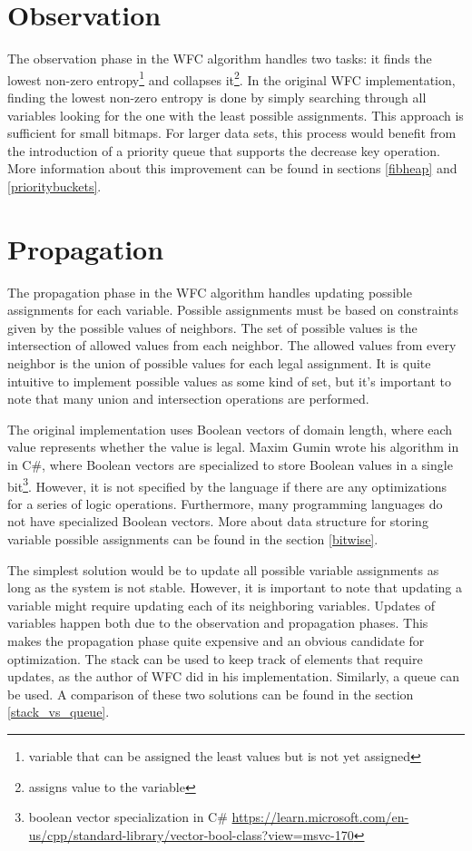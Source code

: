 \documentclass[shortabstract, english, inz]{iithesis}
\begin{document}
\section{Observation}
The observation phase in the WFC algorithm handles two tasks: it finds the lowest non-zero entropy\footnote{variable that can be assigned the least values but is not yet assigned} and collapses it\footnote{assigns value to the variable}.
In the original WFC implementation, finding the lowest non-zero entropy is done by simply searching through all variables looking for the one with the least possible assignments. \cite{MaximGumin} This approach is sufficient for small bitmaps. For larger data sets, this process would benefit from the introduction of a priority queue that supports the decrease key operation.
 More information about this improvement can be found in sections \ref{fibheap} and \ref{prioritybuckets}.

\section{Propagation}%
The propagation phase in the WFC algorithm handles updating possible assignments for each variable. Possible assignments must be based on constraints given by the possible values of neighbors. The set of possible values is the intersection of allowed values from each neighbor. The allowed values from every neighbor is the union of possible values for each legal assignment. It is quite intuitive to implement possible values as some kind of set, but it's important to note that many union and intersection operations are performed.

The original implementation uses Boolean vectors of domain length, where each value represents whether the value is legal. Maxim Gumin wrote his algorithm in in C\#, where Boolean vectors are specialized to store Boolean values in a single bit\footnote{boolean vector specialization in C\# \url{https://learn.microsoft.com/en-us/cpp/standard-library/vector-bool-class?view=msvc-170}}. However, it is not specified by the language if there are any optimizations for a series of logic operations. Furthermore, many programming languages do not have specialized Boolean vectors. More about data structure for storing variable possible assignments can be found in the section \ref{bitwise}.


The simplest solution would be to update all possible variable assignments as long as the system is not stable. However, it is important to note that updating a variable might require updating each of its neighboring variables. Updates of variables happen both due to the observation and propagation phases. This makes the propagation phase quite expensive and an obvious candidate for optimization. The stack can be used to keep track of elements that require updates, as the author of WFC did in his implementation. Similarly, a queue can be used. A comparison of these two solutions can be found in the section \ref{stack_vs_queue}.
\end{document}
